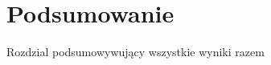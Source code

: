 \chapter{Podsumowanie}
\label{cha:podsumowanie}

Rozdzial podsumowywujący wszystkie wyniki razem









